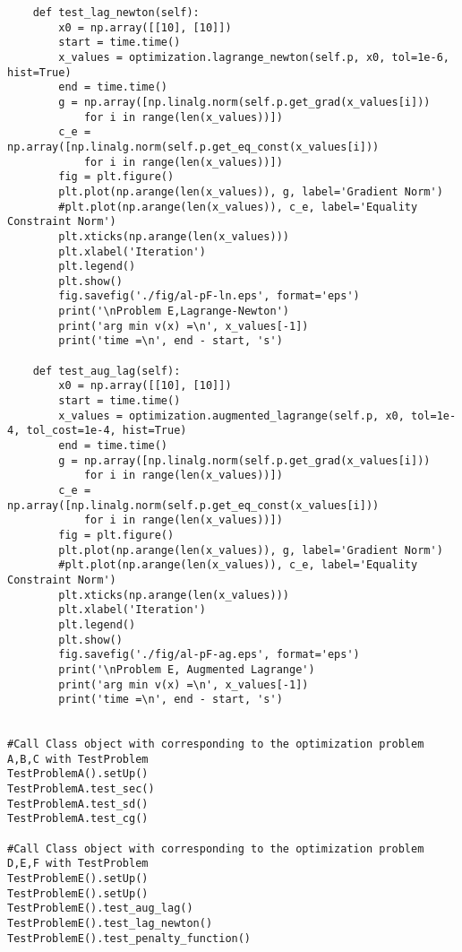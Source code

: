 \begin{lstlisting}
    def test_lag_newton(self):
        x0 = np.array([[10], [10]])
        start = time.time()
        x_values = optimization.lagrange_newton(self.p, x0, tol=1e-6, hist=True)
        end = time.time()
        g = np.array([np.linalg.norm(self.p.get_grad(x_values[i]))
            for i in range(len(x_values))])
        c_e = np.array([np.linalg.norm(self.p.get_eq_const(x_values[i]))
            for i in range(len(x_values))])
        fig = plt.figure()
        plt.plot(np.arange(len(x_values)), g, label='Gradient Norm')
        #plt.plot(np.arange(len(x_values)), c_e, label='Equality Constraint Norm')
        plt.xticks(np.arange(len(x_values)))
        plt.xlabel('Iteration')
        plt.legend()
        plt.show()
        fig.savefig('./fig/al-pF-ln.eps', format='eps')
        print('\nProblem E,Lagrange-Newton')
        print('arg min v(x) =\n', x_values[-1])
        print('time =\n', end - start, 's')
    
    def test_aug_lag(self):
        x0 = np.array([[10], [10]])
        start = time.time()
        x_values = optimization.augmented_lagrange(self.p, x0, tol=1e-4, tol_cost=1e-4, hist=True)
        end = time.time()
        g = np.array([np.linalg.norm(self.p.get_grad(x_values[i]))
            for i in range(len(x_values))])
        c_e = np.array([np.linalg.norm(self.p.get_eq_const(x_values[i]))
            for i in range(len(x_values))])
        fig = plt.figure()
        plt.plot(np.arange(len(x_values)), g, label='Gradient Norm')
        #plt.plot(np.arange(len(x_values)), c_e, label='Equality Constraint Norm')
        plt.xticks(np.arange(len(x_values)))
        plt.xlabel('Iteration')
        plt.legend()
        plt.show()
        fig.savefig('./fig/al-pF-ag.eps', format='eps')
        print('\nProblem E, Augmented Lagrange')
        print('arg min v(x) =\n', x_values[-1])
        print('time =\n', end - start, 's')


#Call Class object with corresponding to the optimization problem A,B,C with TestProblem
TestProblemA().setUp()
TestProblemA.test_sec()
TestProblemA.test_sd()
TestProblemA.test_cg()

#Call Class object with corresponding to the optimization problem D,E,F with TestProblem
TestProblemE().setUp()
TestProblemE().setUp()
TestProblemE().test_aug_lag()
TestProblemE().test_lag_newton()
TestProblemE().test_penalty_function()


\end{lstlisting}